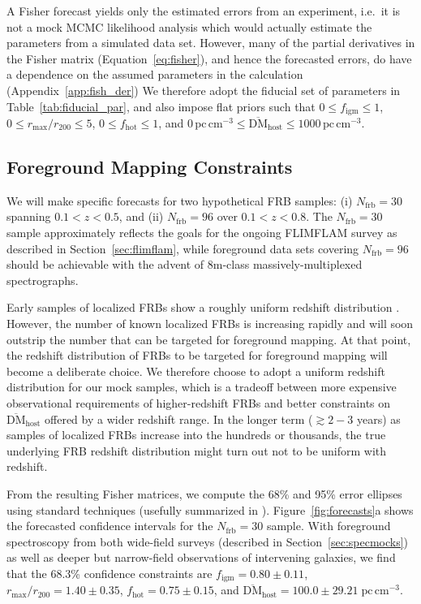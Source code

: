 \documentclass[twocolumn]{aastex63}
\newcommand{\bardmhost}{\ensuremath{\overline{\mathrm{DM}}_\mathrm{host}}}
\newcommand{\pccmcube}{\ensuremath{\mathrm{pc}\,\mathrm{cm}^{-3}}}
\newcommand{\figm}{\ensuremath{f_\mathrm{igm}}}
\newcommand{\fhot}{\ensuremath{f_\mathrm{hot}}}
\newcommand{\rmax}{\ensuremath{r_\mathrm{max}}}
\newcommand{\nfrb}{\ensuremath{N_\mathrm{frb}}}
\begin{document}
\begin{CJK*}{UTF8}{gbsn}
{A Fisher forecast yields only the estimated errors from an experiment, i.e.\ it is not a mock MCMC likelihood analysis which would
actually estimate the parameters from a simulated data set. However, many of the partial derivatives in the Fisher matrix (Equation~\ref{eq:fisher}), and hence the
forecasted errors, do have a dependence on the assumed parameters in the calculation (Appendix~\ref{app:fish_der})
}
We therefore adopt the fiducial set of parameters in Table~\ref{tab:fiducial_par}, and also impose flat priors such that $0\leq\figm \leq 1$, $0 \leq \rmax/r_{200} \leq 5$, $0\leq \fhot \leq 1$, and $0\,\pccmcube \leq \bardmhost \leq 1000\,\pccmcube$.

\subsection{Foreground Mapping Constraints}

We will make specific forecasts for two hypothetical FRB samples: (i) $\nfrb=30$ spanning $0.1<z<0.5$, and (ii) $\nfrb=96$ over $0.1<z<0.8$. 
 The $\nfrb=30$ sample approximately reflects the goals for the ongoing FLIMFLAM survey as described in Section~\ref{sec:flimflam}, 
 while foreground data sets covering $\nfrb=96$ should be achievable with the advent of 8m-class massively-multiplexed spectrographs. 
 
{Early samples of localized FRBs show a roughly uniform redshift distribution \citep[e.g.,][]{heintz:2020}.
However, the number of known localized FRBs is increasing rapidly and will soon outstrip the number that can be targeted for foreground mapping. 
At that point, 
the redshift distribution of FRBs to be targeted for foreground mapping will become a deliberate choice. 
We therefore choose to adopt a uniform redshift distribution for our mock samples, which is a tradeoff between more expensive observational
requirements of higher-redshift FRBs and better constraints on \bardmhost{} offered by a wider redshift range.} {
In the longer term ($\gtrsim 2-3$ years) as samples of localized FRBs increase into the hundreds or thousands, the true underlying
FRB redshift distribution might turn out not to be uniform with redshift.}

{From the resulting Fisher matrices, we compute the 68\% and 95\% error ellipses using
standard techniques (usefully summarized in \citealt{coe:2009}).}
Figure~\ref{fig:forecasts}a shows the forecasted confidence intervals for the $\nfrb=30$ sample. With foreground spectroscopy from both wide-field surveys (described in Section~\ref{sec:specmocks}) as well
as deeper but narrow-field observations of intervening galaxies, we find that the 68.3\% confidence constraints are $\figm = 0.80 \pm 0.11$, $\rmax/r_{200} = 1.40 \pm 0.35$, $\fhot = 0.75 \pm 0.15$, and $\bardmhost = 100.0 \pm 29.21\; \pccmcube$. 


\end{CJK*}
\end{document}
